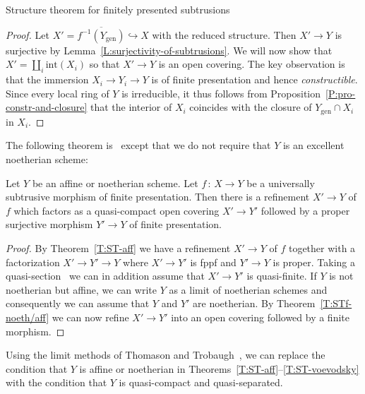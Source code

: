 \documentclass[a4paper,twoside,11pt]{amsart}[2009/07/02] %
\newcommand{\pref}[1]{\eqref{#1}}
\newcommand{\inj}{\hookrightarrow}
\newcommand{\map}[3]{#1\,:\, #2\rightarrow #3}
\newcommand{\genpts}{\mathrm{gen}} %
\newcommand{\interior}{\mathrm{int}}
\begin{document}
\begin{section}{Structure theorem for finitely presented subtrusions}
\begin{proof}
Let $X'=\overline{f^{-1}(Y_\genpts)}\inj X$ with the reduced structure.
%
Then $X'\to Y$ is surjective by Lemma~\pref{L:surjectivity-of-subtrusions}.
%
We will now show that $X'=\coprod_i \interior(X_i)$ so that $X'\to Y$ is an
open covering. The key observation is that the immersion $X_i\to
Y_i\to Y$ is of finite presentation and hence \emph{constructible}.
%
Since every local ring of $Y$ is irreducible, it thus follows from
Proposition~\pref{P:pro-constr-and-closure} that the interior
of $X_i$ coincides with the closure of $Y_\genpts\cap X_i$ in $X_i$.
\end{proof}

The following theorem is~\cite[Thm.~3.1.9]{voevodsky_homology} except that
we do not require that $Y$ is an excellent noetherian scheme:

\begin{theorem}\label{T:ST-voevodsky}
Let $Y$ be an affine or noetherian scheme. Let $\map{f}{X}{Y}$ be a
universally subtrusive morphism of finite presentation. Then there is a
refinement $X'\to Y$ of $f$ which factors as a quasi-compact open covering
$X'\to Y'$ followed by a proper surjective morphism $Y'\to Y$ of finite
presentation.
\end{theorem}
\begin{proof}
By Theorem~\pref{T:ST-aff} we have a refinement
$X'\to Y$ of $f$ together with a factorization $X'\to Y'\to Y$ where $X'\to Y'$
is fppf and $Y'\to Y$ is proper. Taking a
quasi-section~\cite[Cor.~17.16.2]{egaIV} we can in addition assume that $X'\to
Y'$ is quasi-finite. If $Y$ is not noetherian but affine, we can write $Y$ as a
limit of noetherian schemes and consequently we can assume that $Y$ and $Y'$
are noetherian.
By Theorem~\pref{T:STf-noeth/aff} we can now refine $X'\to Y'$ into an open
covering followed by a finite morphism.
\end{proof}

\begin{remark}
Using the limit methods of Thomason and
Trobaugh~\cite[App.~C]{thomason-trobaugh}, we can replace the condition that
$Y$ is affine or noetherian in
%
Theorems~\pref{T:ST-aff}--\pref{T:ST-voevodsky}
%
with the condition that $Y$ is quasi-compact and quasi-separated.
\end{remark}


\end{section}
\end{document}
